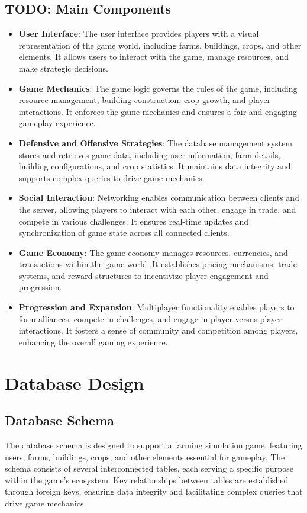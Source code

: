 \documentclass[12pt]{article}
\begin{document}
\subsection{TODO: Main Components}
\begin{itemize}
    \item \textbf{User Interface}: The user interface provides players with a visual representation of the game world, including farms, buildings, crops, and other elements. It allows users to interact with the game, manage resources, and make strategic decisions.
    \item \textbf{Game Mechanics}: The game logic governs the rules of the game, including resource management, building construction, crop growth, and player interactions. It enforces the game mechanics and ensures a fair and engaging gameplay experience.
    \item \textbf{Defensive and Offensive Strategies}: The database management system stores and retrieves game data, including user information, farm details, building configurations, and crop statistics. It maintains data integrity and supports complex queries to drive game mechanics.
    \item \textbf{Social Interaction}: Networking enables communication between clients and the server, allowing players to interact with each other, engage in trade, and compete in various challenges. It ensures real-time updates and synchronization of game state across all connected clients.
    \item \textbf{Game Economy}: The game economy manages resources, currencies, and transactions within the game world. It establishes pricing mechanisms, trade systems, and reward structures to incentivize player engagement and progression.
    \item \textbf{Progression and Expansion}: Multiplayer functionality enables players to form alliances, compete in challenges, and engage in player-versus-player interactions. It fosters a sense of community and competition among players, enhancing the overall gaming experience.
\end{itemize}

\section{Database Design}
\subsection{Database Schema}
The database schema is designed to support a farming simulation game, featuring users, farms, buildings, crops, and other elements essential for gameplay. The schema consists of several interconnected tables, each serving a specific purpose within the game's ecosystem. Key relationships between tables are established through foreign keys, ensuring data integrity and facilitating complex queries that drive game mechanics.
\end{document}

